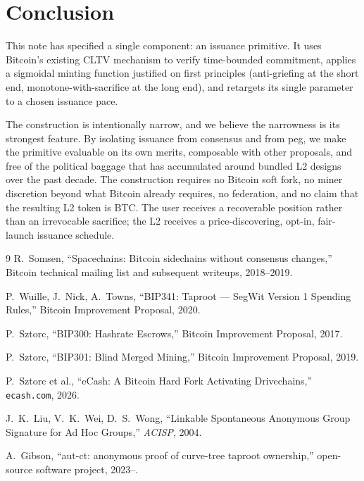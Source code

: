 \documentclass[11pt,a4paper]{article}
\begin{document}
\section{Conclusion}

This note has specified a single component: an issuance primitive. It uses Bitcoin's existing CLTV mechanism to verify time-bounded commitment, applies a sigmoidal minting function justified on first principles (anti-griefing at the short end, monotone-with-sacrifice at the long end), and retargets its single parameter to a chosen issuance pace.

The construction is intentionally narrow, and we believe the narrowness is its strongest feature. By isolating issuance from consensus and from peg, we make the primitive evaluable on its own merits, composable with other proposals, and free of the political baggage that has accumulated around bundled L2 designs over the past decade. The construction requires no Bitcoin soft fork, no miner discretion beyond what Bitcoin already requires, no federation, and no claim that the resulting L2 token is BTC. The user receives a recoverable position rather than an irrevocable sacrifice; the L2 receives a price-discovering, opt-in, fair-launch issuance schedule.

\begin{thebibliography}{9}
R.~Somsen, ``Spacechains: Bitcoin sidechains without consensus changes,'' Bitcoin technical mailing list and subsequent writeups, 2018--2019.

P.~Wuille, J.~Nick, A.~Towns, ``BIP341: Taproot --- SegWit Version 1 Spending Rules,'' Bitcoin Improvement Proposal, 2020.

P.~Sztorc, ``BIP300: Hashrate Escrows,'' Bitcoin Improvement Proposal, 2017.

P.~Sztorc, ``BIP301: Blind Merged Mining,'' Bitcoin Improvement Proposal, 2019.

P.~Sztorc et al., ``eCash: A Bitcoin Hard Fork Activating Drivechains,'' \texttt{ecash.com}, 2026.

J.~K.~Liu, V.~K.~Wei, D.~S.~Wong, ``Linkable Spontaneous Anonymous Group Signature for Ad Hoc Groups,'' \emph{ACISP}, 2004.

A.~Gibson, ``aut-ct: anonymous proof of curve-tree taproot ownership,'' open-source software project, 2023--.
\end{thebibliography}
\end{document}
